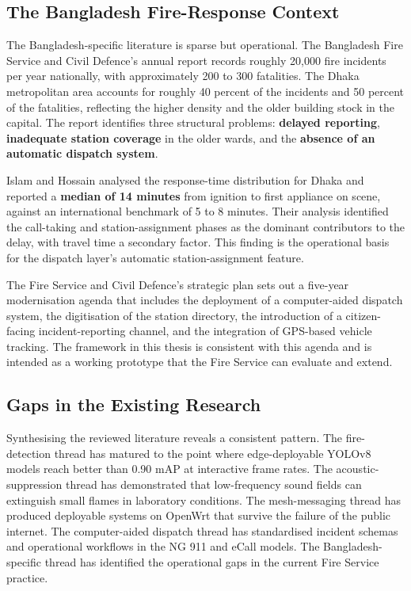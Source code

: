 \subsection{The Bangladesh Fire-Response Context}

The Bangladesh-specific literature is sparse but operational. The Bangladesh Fire Service and Civil Defence's annual report \cite{fscdAnnual2024} records roughly 20{,}000 fire incidents per year nationally, with approximately 200 to 300 fatalities. The Dhaka metropolitan area accounts for roughly 40 percent of the incidents and 50 percent of the fatalities, reflecting the higher density and the older building stock in the capital. The report identifies three structural problems: \textbf{delayed reporting}, \textbf{inadequate station coverage} in the older wards, and the \textbf{absence of an automatic dispatch system}.

Islam and Hossain \cite{islam2020dhakafire} analysed the response-time distribution for Dhaka and reported a \textbf{median of 14 minutes} from ignition to first appliance on scene, against an international benchmark of 5 to 8 minutes. Their analysis identified the call-taking and station-assignment phases as the dominant contributors to the delay, with travel time a secondary factor. This finding is the operational basis for the dispatch layer's automatic station-assignment feature.

The Fire Service and Civil Defence's strategic plan \cite{fscd2021strategic} sets out a five-year modernisation agenda that includes the deployment of a computer-aided dispatch system, the digitisation of the station directory, the introduction of a citizen-facing incident-reporting channel, and the integration of GPS-based vehicle tracking. The framework in this thesis is consistent with this agenda and is intended as a working prototype that the Fire Service can evaluate and extend.

\subsection{Gaps in the Existing Research}

Synthesising the reviewed literature reveals a consistent pattern. The fire-detection thread has matured to the point where edge-deployable YOLOv8 models reach better than 0.90 mAP at interactive frame rates. The acoustic-suppression thread has demonstrated that low-frequency sound fields can extinguish small flames in laboratory conditions. The mesh-messaging thread has produced deployable systems on OpenWrt that survive the failure of the public internet. The computer-aided dispatch thread has standardised incident schemas and operational workflows in the NG 911 and eCall models. The Bangladesh-specific thread has identified the operational gaps in the current Fire Service practice.

